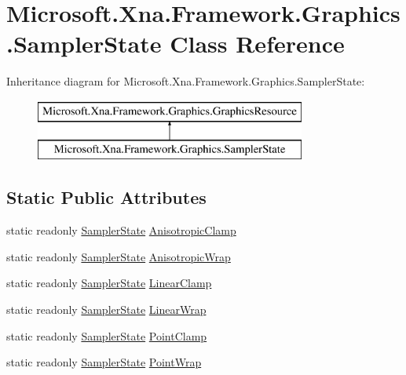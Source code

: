 \hypertarget{class_microsoft_1_1_xna_1_1_framework_1_1_graphics_1_1_sampler_state}{}\section{Microsoft.\+Xna.\+Framework.\+Graphics.\+Sampler\+State Class Reference}
\label{class_microsoft_1_1_xna_1_1_framework_1_1_graphics_1_1_sampler_state}
Inheritance diagram for Microsoft.\+Xna.\+Framework.\+Graphics.\+Sampler\+State\+:\begin{figure}[H]
\begin{center}
\leavevmode
\includegraphics[height=2.000000cm]{class_microsoft_1_1_xna_1_1_framework_1_1_graphics_1_1_sampler_state}
\end{center}
\end{figure}
\subsection*{Static Public Attributes}
\begin{DoxyCompactItemize}
\item 
static readonly \hyperlink{class_microsoft_1_1_xna_1_1_framework_1_1_graphics_1_1_sampler_state}{Sampler\+State} \hyperlink{class_microsoft_1_1_xna_1_1_framework_1_1_graphics_1_1_sampler_state_aafb317df354906e033ded4b979dc159a}{Anisotropic\+Clamp}
\item 
static readonly \hyperlink{class_microsoft_1_1_xna_1_1_framework_1_1_graphics_1_1_sampler_state}{Sampler\+State} \hyperlink{class_microsoft_1_1_xna_1_1_framework_1_1_graphics_1_1_sampler_state_a5ada0778d03c2d0f5c3805cb2a95fd6d}{Anisotropic\+Wrap}
\item 
static readonly \hyperlink{class_microsoft_1_1_xna_1_1_framework_1_1_graphics_1_1_sampler_state}{Sampler\+State} \hyperlink{class_microsoft_1_1_xna_1_1_framework_1_1_graphics_1_1_sampler_state_aeda6b67c8ecbefce230c9864b5ed583b}{Linear\+Clamp}
\item 
static readonly \hyperlink{class_microsoft_1_1_xna_1_1_framework_1_1_graphics_1_1_sampler_state}{Sampler\+State} \hyperlink{class_microsoft_1_1_xna_1_1_framework_1_1_graphics_1_1_sampler_state_a461e4d9b2c895670c6b44a9bfb94a26b}{Linear\+Wrap}
\item 
static readonly \hyperlink{class_microsoft_1_1_xna_1_1_framework_1_1_graphics_1_1_sampler_state}{Sampler\+State} \hyperlink{class_microsoft_1_1_xna_1_1_framework_1_1_graphics_1_1_sampler_state_ab9ab8bb9716c1e4331f54dedac30d2f9}{Point\+Clamp}
\item 
static readonly \hyperlink{class_microsoft_1_1_xna_1_1_framework_1_1_graphics_1_1_sampler_state}{Sampler\+State} \hyperlink{class_microsoft_1_1_xna_1_1_framework_1_1_graphics_1_1_sampler_state_a7f67a63457b86bab7d49285c4d790970}{Point\+Wrap}
\end{DoxyCompactItemize}
